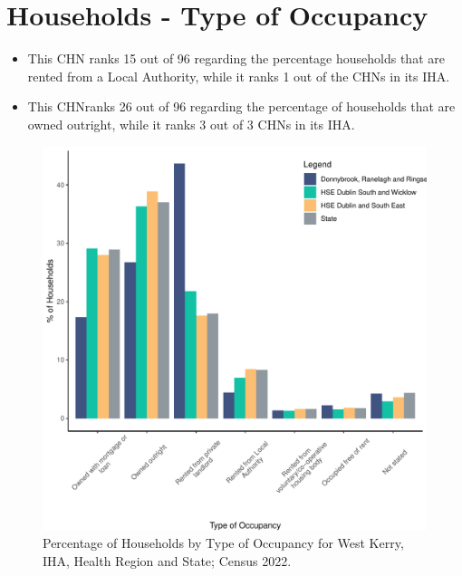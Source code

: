 \documentclass{article}
\begin{document}
\section{Households - Type of Occupancy}\label{sect:Households}
\begin{itemize}
\item This CHN ranks  15 out of 96 regarding the percentage households that are rented from a Local Authority, while it ranks  1 out of the CHNs in its IHA. 
\item This CHNranks  26 out of 96 regarding the percentage of households that are owned outright, while it ranks   3 out of 3 CHNs in its IHA.
\end{itemize}
\begin{figure}[H]
	\centering
	\includegraphics[width = 140mm]{../figures/HouseholdsED.pdf}
	\caption{Percentage of Households by Type of Occupancy for West Kerry, IHA, Health Region and State; Census 2022.}
	\label{fig:vbnv}
	\end{figure}
\end{document}
